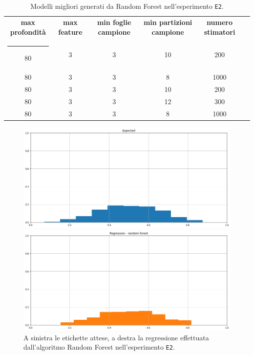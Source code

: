 \documentclass[12pt]{report}
\makeatletter
\theoremstyle{definition}
\newcommand{\thickhline}{%
    \noalign {\ifnum 0=`}\fi \hrule height 1pt
    \futurelet \reserved@a \@xhline
}
\makeatother
\begin{document}
\begin{table}
\centering
\begin{adjustbox}{max width=\textwidth}
 \begin{tabular}{|c|c|c|c|c|c|} 
 \hline
\textbf{max profondità} & \textbf{max feature} & \textbf{min foglie campione} & \textbf{min partizioni campione} & \textbf{numero stimatori}
\\ [0.5ex] 
 \thickhline
 80 & 3 & 3 & 10 & 200 \\ 
 80 & 3 & 3 & 8 & 1000 \\ 
 80 & 3 & 3 & 10 & 200 \\ 
 80 & 3 & 3 & 12 & 300 \\ 
 80 & 3 & 3 & 8 & 1000 \\ 
 \hline
\end{tabular}
\end{adjustbox}
\caption{Modelli migliori generati da Random Forest nell'esperimento \texttt{E2}.}
\label{models_rf_exp2}
\end{table}

\begin{figure}
\centering
    \begin{minipage}{0.48\textwidth}
        \includegraphics[width=\linewidth]{images/experiment_beta5_disgiunti/expected_memberships.png}
    \end{minipage}
    \begin{minipage}{0.48\textwidth}
        \includegraphics[width=\linewidth]{images/experiment_beta5_disgiunti/prediction_regression_rf.png}
    \end{minipage}
    \caption{A sinistra le etichette attese, a destra la regressione effettuata dall'algoritmo Random Forest nell'esperimento \texttt{E2}.}
    \label{rf_exp2}
\end{figure} 
\end{document}
